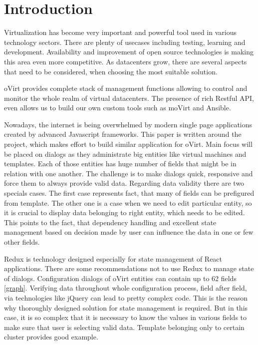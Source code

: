 
\chapter{Introduction}
Virtualization has become very important and powerful tool used in various technology sectors. There are plenty of usecases including testing, learning and development. Availability and improvement of open source technologies is making this area even more competitive. As datacenters grow, there are several aspects that need to be considered, when choosing the most suitable solution.

oVirt\cite{oVirt} provides complete stack of management functions allowing to control and monitor the whole realm of virtual datacenters. The presence of rich Restful API, even allows us to build our own custom tools such as moVirt\cite{moVirt} and Ansible\cite{Ansible}. 

Nowadays, the internet is being overwhelmed by modern single page applications created by advanced Javascript frameworks. This paper is written around the project, which makes effort to build similar application for oVirt. Main focus will be placed on dialogs as they administrate big entities like virtual machines and templates. Each of those entities has huge number of fields that might be in relation with one another. The challenge is to make dialogs quick, responsive and force them to always provide valid data. Regarding data validity there are two specials cases. The first case represents fact, that many of fields can be prefigured from template. The other one is a case when we need to edit particular entity, so it is crucial to display data belonging to right entity, which needs to be edited. This points to the fact, that dependency handling and excellent state management based on decision made by user can influence the data in one or few other fields.

Redux is technology designed especially for state management of React\cite{React} applications. There are some recommendations not to use Redux\cite{Redux} to manage state of dialogs. Configuration dialogs of oVirt entities can contain up to 62 fields \ref{graph}. Verifying data throughout whole configuration process, field after field, via technologies like jQuery can lead to pretty complex code. This is the reason why thoroughly designed solution for state management is required. But in this case, it is so complex that it is necessary to know the values in various fields to make sure that user is selecting valid data. Template belonging only to certain cluster provides good example.

